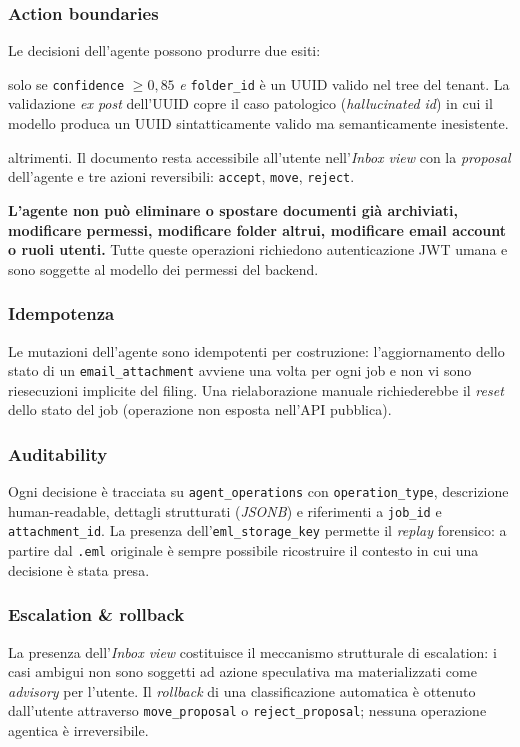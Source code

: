 \documentclass[11pt,a4paper,oneside]{article}
\begin{document}
\subsubsection{Action boundaries}
Le decisioni dell'agente possono produrre due esiti:
\begin{description}[leftmargin=*]
    \item[\texttt{auto\_filed}] solo se \texttt{confidence}
          $\geq 0{,}85$ \emph{e} \texttt{folder\_id} \`e un UUID valido nel
          tree del tenant. La validazione \emph{ex post} dell'UUID copre il
          caso patologico (\emph{hallucinated id}) in cui il modello produca un
          UUID sintatticamente valido ma semanticamente inesistente.
    \item[\texttt{in\_inbox}] altrimenti. Il documento resta accessibile
          all'utente nell'\emph{Inbox view} con la \emph{proposal} dell'agente
          e tre azioni reversibili: \texttt{accept}, \texttt{move},
          \texttt{reject}.
\end{description}
\textbf{L'agente non pu\`o eliminare o spostare documenti gi\`a archiviati,
modificare permessi, modificare folder altrui, modificare email account o
ruoli utenti.} Tutte queste operazioni richiedono autenticazione JWT umana
e sono soggette al modello dei permessi del backend.

\subsubsection{Idempotenza}
Le mutazioni dell'agente sono idempotenti per costruzione: l'aggiornamento
dello stato di un \texttt{email\_attachment} avviene una volta per ogni job e
non vi sono riesecuzioni implicite del filing. Una rielaborazione manuale
richiederebbe il \emph{reset} dello stato del job (operazione non esposta
nell'API pubblica).

\subsubsection{Auditability}
Ogni decisione \`e tracciata su \texttt{agent\_operations} con
\texttt{operation\_type}, descrizione human-readable, dettagli strutturati
(\emph{JSONB}) e riferimenti a \texttt{job\_id} e \texttt{attachment\_id}.
La presenza dell'\texttt{eml\_storage\_key} permette il \emph{replay}
forensico: a partire dal \texttt{.eml} originale \`e sempre possibile
ricostruire il contesto in cui una decisione \`e stata presa.

\subsubsection{Escalation \& rollback}
La presenza dell'\emph{Inbox view} costituisce il meccanismo strutturale di
escalation: i casi ambigui non sono soggetti ad azione speculativa ma
materializzati come \emph{advisory} per l'utente. Il \emph{rollback} di una
classificazione automatica \`e ottenuto dall'utente attraverso
\texttt{move\_proposal} o \texttt{reject\_proposal}; nessuna operazione
agentica \`e irreversibile.
\end{document}
